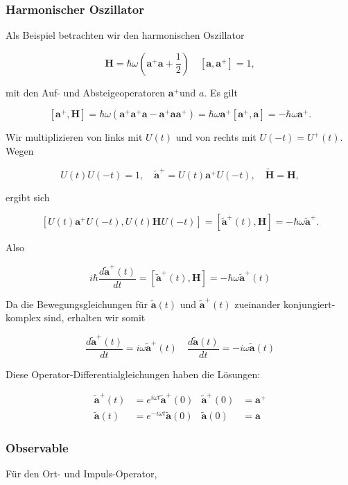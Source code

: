 \documentclass[10pt, letterpaper]{article}
\begin{document}
\subsubsection*{Harmonischer Oszillator}
Als Beispiel betrachten wir den harmonischen Oszillator

$$
\mathbf{H}=\hbar \omega\left(\mathbf{a}^{+} \mathbf{a}+\frac{1}{2}\right) \quad\left[\mathbf{a}, \mathbf{a}^{+}\right]=1,
$$

mit den Auf- und Absteigeoperatoren $\mathbf{a}^{+}$und $a$. Es gilt

$$
\left[\mathbf{a}^{+}, \mathbf{H}\right]=\hbar \omega\left(\mathbf{a}^{+} \mathbf{a}^{+} \mathbf{a}-\mathbf{a}^{+} \mathbf{a a}^{+}\right)=\hbar \omega \mathbf{a}^{+}\left[\mathbf{a}^{+}, \mathbf{a}\right]=-\hbar \omega \mathbf{a}^{+} .
$$

Wir multiplizieren von links mit $U(t)$ und von rechts mit $U(-t)=U^{+}(t)$. Wegen

$$
U(t) U(-t)=1, \quad \tilde{\mathbf{a}}^{+}=U(t) \mathbf{a}^{+} U(-t), \quad \tilde{\mathbf{H}}=\mathbf{H},
$$

ergibt sich

$$
\left[U(t) \mathbf{a}^{+} U(-t), U(t) \mathbf{H} U(-t)\right]=\left[\tilde{\mathbf{a}}^{+}(t), \mathbf{H}\right]=-\hbar \omega \tilde{\mathbf{a}}^{+} .
$$

Also

$$
i \hbar \frac{d \tilde{\mathbf{a}}^{+}(t)}{d t}=\left[\tilde{\mathbf{a}}^{+}(t), \mathbf{H}\right]=-\hbar \omega \tilde{\mathbf{a}}^{+}(t)
$$

Da die Bewegungsgleichungen für $\tilde{\mathbf{a}}(t)$ und $\tilde{\mathbf{a}}^{+}(t)$ zueinander konjungiert-komplex sind, erhalten wir somit

$$
\frac{d \tilde{\mathbf{a}}^{+}(t)}{d t}=i \omega \tilde{\mathbf{a}}^{+}(t) \quad \frac{d \tilde{\mathbf{a}}(t)}{d t}=-i \omega \tilde{\mathbf{a}}(t)
$$

Diese Operator-Differentialgleichungen haben die Lösungen:

$$
\begin{aligned}
\tilde{\mathbf{a}}^{+}(t) & =e^{i \omega t} \tilde{\mathbf{a}}^{+}(0) & \tilde{\mathbf{a}}^{+}(0) & =\mathbf{a}^{+} \\
\tilde{\mathbf{a}}(t) & =e^{-i \omega t} \tilde{\mathbf{a}}(0) & \tilde{\mathbf{a}}(0) & =\mathbf{a}
\end{aligned}
$$

\subsubsection*{Observable}
Für den Ort- und Impuls-Operator,
\end{document}
